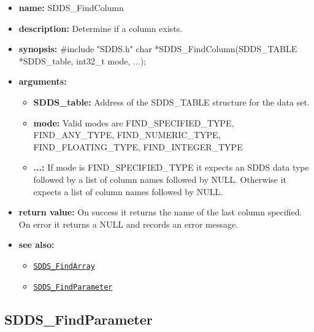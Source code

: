 \documentclass[11pt]{article}
\newcommand{\progref}[1]{\hyperref[SDDS_#1]{\tt SDDS\_#1}}
\begin{document}
\begin{itemize}
\item {\bf name:}\newline
SDDS\_FindColumn
\item {\bf description:}\newline
Determine if a column exists.
\item {\bf synopsis:} \#include "SDDS.h"\newline
char *SDDS\_FindColumn(SDDS\_TABLE *SDDS\_table, int32\_t mode, ...);
\item {\bf arguments:}
\begin{itemize}
\item {\bf SDDS\_table:} Address of the SDDS\_TABLE structure for the data set.
\item {\bf mode:} Valid modes are FIND\_SPECIFIED\_TYPE, FIND\_ANY\_TYPE, FIND\_NUMERIC\_TYPE, FIND\_FLOATING\_TYPE, FIND\_INTEGER\_TYPE
\item {\bf ...:} If mode is FIND\_SPECIFIED\_TYPE it expects an SDDS data type followed by a list of column names followed by NULL. Otherwise it expects a list of column names followed by NULL.
\end{itemize}
\item {\bf return value:}\newline
On success it returns the name of the last column specified. On error it returns a NULL and records an error message.
\item {\bf see also:}
\begin{itemize}
\item \progref{FindArray}
\item \progref{FindParameter}
\end{itemize}
\end{itemize}

\subsection{SDDS\_FindParameter}
\label{SDDS_FindParameter}
\end{document}
